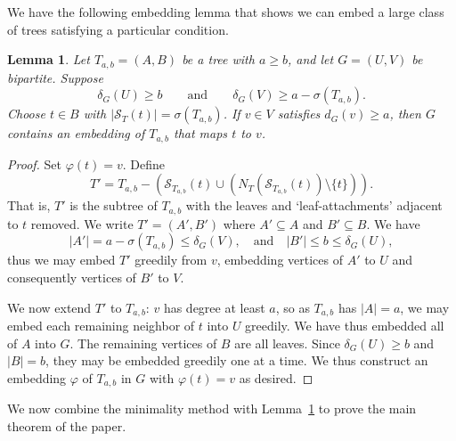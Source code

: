 \documentclass[10pt,a4paper]{amsart}
\newtheorem{lemma}[theorem]{Lemma}
\begin{document}
\noindent We have the following embedding lemma that shows we can embed a large class of trees satisfying a particular condition.


\begin{lemma}
\label{lem:embedding}
Let $T_{a,b}=(A,B)$ be a tree with $a\ge b$, and let $G=(U,V)$ be bipartite. Suppose
\[
    \delta_G(U)\ge b\qquad\text{and}\qquad\delta_G(V)\ge a-\sigma(T_{a,b}).
\]
Choose $t\in B$ with $|\mathcal S_T(t)|=\sigma(T_{a,b})$. If $v\in V$ satisfies $d_G(v)\ge a$, then $G$ contains an embedding of $T_{a,b}$ that maps $t$ to $v$.
\end{lemma}



\begin{proof}
Set $\varphi(t)=v$. Define 
\[
T'=T_{a,b}-(\mathcal{S}_{T_{a,b}}(t)\cup (N_T(\mathcal{S}_{T_{a,b}}(t))\setminus\{t\})).
\]
That is, $T'$ is the subtree of $T_{a,b}$ with the leaves and `leaf-attachments' adjacent to $t$ removed.  We write $T'=(A',B')$ where $A'\subseteq A$ and $B'\subseteq B$.  We have 
\[
|A'|=a-\sigma(T_{a,b})\leq\delta_G(V),\quad \text{and}\quad|B'|\leq b\leq\delta_G(U),
\]
thus we may embed $T'$ greedily from $v$, embedding vertices of $A'$ to $U$ and consequently vertices of $B'$ to $V$.

We now extend $T'$ to $T_{a,b}$: $v$ has degree at least $a$, so as $T_{a,b}$ has $|A|=a$, we may embed each remaining neighbor of $t$ into $U$ greedily. We have thus embedded all of $A$ into $G$. The remaining vertices of $B$ are all leaves. Since $\delta_G(U)\geq b$ and $|B|=b$, they may be embedded greedily one at a time. We thus construct an embedding $\varphi$ of $T_{a,b}$ in $G$ with $\varphi(t)=v$ as desired.
\end{proof}

\noindent We now combine the minimality method with Lemma~\ref{lem:embedding} to prove the main theorem of the paper.
\end{document}
